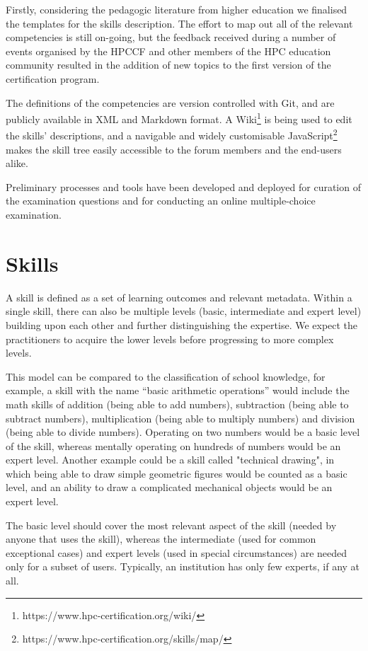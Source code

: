 \documentclass[jocse]{jocseart}
\begin{document}
Firstly, considering the pedagogic literature from higher education we finalised the templates for the skills description.
The effort to map out all of the relevant competencies is still on-going, but the feedback received during a number of events organised by the HPCCF and other members of the HPC education community resulted in the addition of new topics to the first version of the certification program.

The definitions of the competencies are version controlled with Git, and are publicly available in XML and Markdown format.
A Wiki\footnote{https://www.hpc-certification.org/wiki/} is being used to edit the skills' descriptions, and a navigable and widely customisable JavaScript\footnote{https://www.hpc-certification.org/skills/map/} makes the skill tree easily accessible to the forum members and the end-users alike.

Preliminary processes and tools have been developed and deployed for curation of the examination questions and for conducting an online multiple-choice examination.

\section{Skills}
\label{sec:skills}

A skill is defined as a set of learning outcomes and relevant metadata.
Within a single skill, there can also be multiple levels (basic, intermediate and expert level) building upon each other and further distinguishing the expertise.
We expect the practitioners to acquire the lower levels before progressing to more complex levels.

This model can be compared to the classification of school knowledge, for example, a skill with the name “basic arithmetic operations” would include the math skills of addition (being able to add numbers), subtraction (being able to subtract numbers), multiplication (being able to multiply numbers) and division (being able to divide numbers). Operating on two numbers would be a basic level of the skill, whereas mentally operating on hundreds of numbers would be an expert level. Another example could be a skill called "technical drawing", in which being able to draw simple geometric figures would be counted as a basic level, and an ability to draw a complicated mechanical objects would be an expert level.

The basic level should cover the most relevant aspect of the skill (needed by anyone that uses the skill), whereas the intermediate (used for common exceptional cases) and expert levels (used in special circumstances)  are needed only for a subset of users.
Typically, an institution has only few experts, if any at all.
\end{document}
